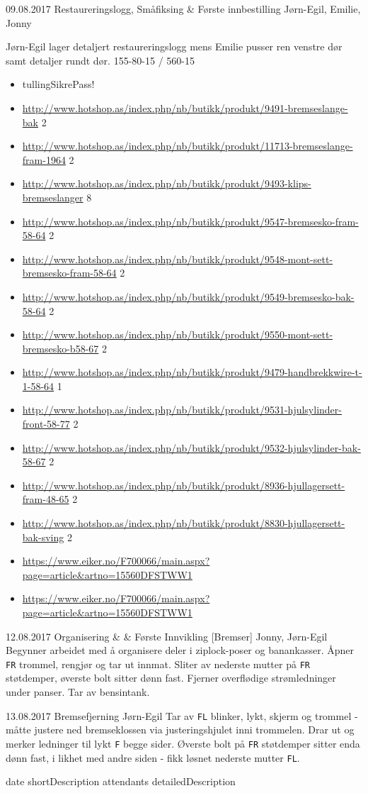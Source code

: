 \worklogitem
	{09.08.2017}
	{Restaureringslogg, Småfiksing \& Første innbestilling}
	{J\o rn-Egil, Emilie, Jonny}
	{J\o rn-Egil lager detaljert restaureringslogg mens Emilie pusser ren venstre d\o r samt detaljer rundt d\o r. 155-80-15 / 560-15
	\begin{itemize}

		\item tullingSikrePass!
		\item \url{http://www.hotshop.as/index.php/nb/butikk/produkt/9491-bremseslange-bak} 2
		\item \url{http://www.hotshop.as/index.php/nb/butikk/produkt/11713-bremseslange-fram-1964} 2
		\item \url{http://www.hotshop.as/index.php/nb/butikk/produkt/9493-klips-bremseslanger} 8
		\item \url{http://www.hotshop.as/index.php/nb/butikk/produkt/9547-bremsesko-fram-58-64} 2
		\item \url{http://www.hotshop.as/index.php/nb/butikk/produkt/9548-mont-sett-bremsesko-fram-58-64} 2
		\item \url{http://www.hotshop.as/index.php/nb/butikk/produkt/9549-bremsesko-bak-58-64} 2
		\item \url{http://www.hotshop.as/index.php/nb/butikk/produkt/9550-mont-sett-bremsesko-b58-67} 2
		\item \url{http://www.hotshop.as/index.php/nb/butikk/produkt/9479-handbrekkwire-t-1-58-64} 1
		\item \url{http://www.hotshop.as/index.php/nb/butikk/produkt/9531-hjulsylinder-front-58-77} 2
		\item \url{http://www.hotshop.as/index.php/nb/butikk/produkt/9532-hjulsylinder-bak-58-67} 2
		\item \url{http://www.hotshop.as/index.php/nb/butikk/produkt/8936-hjullagersett-fram-48-65} 2
		\item \url{http://www.hotshop.as/index.php/nb/butikk/produkt/8830-hjullagersett-bak-sving} 2

		\item \url{https://www.eiker.no/F700066/main.aspx?page=article&artno=15560DFSTWW1}
		\item \url{https://www.eiker.no/F700066/main.aspx?page=article&artno=15560DFSTWW1}
	\end{itemize}
	}


\worklogitem
	{12.08.2017}
	{Organisering & \& F\o rste Innvikling [Bremser]}
	{Jonny, J\o rn-Egil}
	{Begynner arbeidet med å organisere deler i ziplock-poser og banankasser. Åpner \texttt{FR} trommel, rengjør og tar ut innmat. Sliter av nederste mutter på \texttt{FR} støtdemper, øverste bolt sitter dønn fast. Fjerner overflødige strømledninger under panser. Tar av bensintank.}

\worklogitem
	{13.08.2017}
	{Bremsefjerning}
	{J\o rn-Egil}
	{Tar av \texttt{FL} blinker, lykt, skjerm og trommel - måtte justere ned bremseklossen via justeringshjulet inni trommelen. Drar ut og merker ledninger til lykt \texttt{F} begge sider. Øverste bolt på \texttt{FR} støtdemper sitter enda dønn fast, i likhet med andre siden - fikk løsnet nederste mutter \texttt{FL}.}

\worklogitem
	{date}
	{shortDescription}
	{attendants}
	{detailedDescription}
